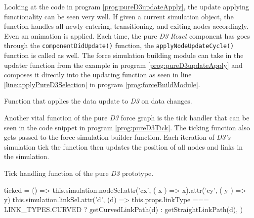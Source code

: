 Looking at the code in program \ref{prog:pureD3updateApply}, the update applying functionality can be seen very well. If given a current simulation object, the function handles all newly entering, transitioning, and exiting nodes accordingly. Even an animation is applied. Each time, the pure \emph{D3} \emph{React} component has goes through the \texttt{componentDidUpdate()} function, the \texttt{applyNodeUpdateCycle()} function is called as well. The force simulation building module can take in the updater function from the example in program \ref{prog:pureD3updateApply} and composes it directly into the updating function as seen in line \ref{line:applyPureD3Selection} in program \ref{prog:forceBuildModule}.

\begin{program}[th]
\caption{Function that applies the data update to \emph{D3} on data changes.}
\label{prog:pureD3updateApply}
\end{program}

Another vital function of the pure \emph{D3} force graph is the tick handler that can be seen in the code snippet in program \ref{prog:pureD3Tick}. The ticking function also gets passed to the force simulation builder function. Each iteration of \emph{D3's} simulation tick the function then updates the position of all nodes and links in the simulation.

\begin{program}[th]
\caption{Tick handling function of the pure \emph{D3} prototype.}
\label{prog:pureD3Tick}
\begin{JsCode}
ticked = () => {
  this.simulation.nodeSel.attr('cx', ({ x }) => x).attr('cy', ({ y }) => y)
  this.simulation.linkSel.attr('d', (d) =>
    this.props.linkType === LINK_TYPES.CURVED ? getCurvedLinkPath(d) : getStraightLinkPath(d),
  )
}
\end{JsCode}
\end{program}

